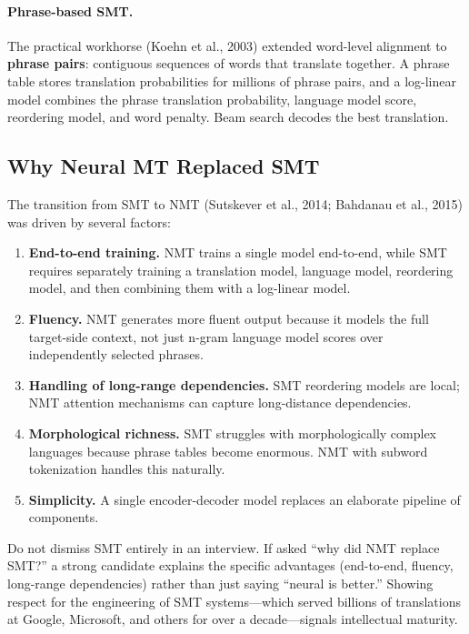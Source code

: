 \paragraph{Phrase-based SMT.}
The practical workhorse (Koehn et al., 2003) extended word-level alignment
to \textbf{phrase pairs}: contiguous sequences of words that translate
together.  A phrase table stores translation probabilities for millions of
phrase pairs, and a log-linear model combines the phrase translation
probability, language model score, reordering model, and word penalty.
Beam search decodes the best translation.

\subsection{Why Neural MT Replaced SMT}

The transition from SMT to NMT (Sutskever et al., 2014; Bahdanau et al., 2015)
was driven by several factors:

\begin{enumerate}
    \item \textbf{End-to-end training.}  NMT trains a single model end-to-end,
    while SMT requires separately training a translation model, language model,
    reordering model, and then combining them with a log-linear model.

    \item \textbf{Fluency.}  NMT generates more fluent output because it
    models the full target-side context, not just n-gram language model
    scores over independently selected phrases.

    \item \textbf{Handling of long-range dependencies.}  SMT reordering models
    are local; NMT attention mechanisms can capture long-distance dependencies.

    \item \textbf{Morphological richness.}  SMT struggles with morphologically
    complex languages because phrase tables become enormous.  NMT with subword
    tokenization handles this naturally.

    \item \textbf{Simplicity.}  A single encoder-decoder model replaces an
    elaborate pipeline of components.
\end{enumerate}

\begin{warningbox}
Do not dismiss SMT entirely in an interview.  If asked ``why did NMT replace
SMT?'' a strong candidate explains the specific advantages (end-to-end,
fluency, long-range dependencies) rather than just saying ``neural is better.''
Showing respect for the engineering of SMT systems---which served billions of
translations at Google, Microsoft, and others for over a decade---signals
intellectual maturity.
\end{warningbox}


